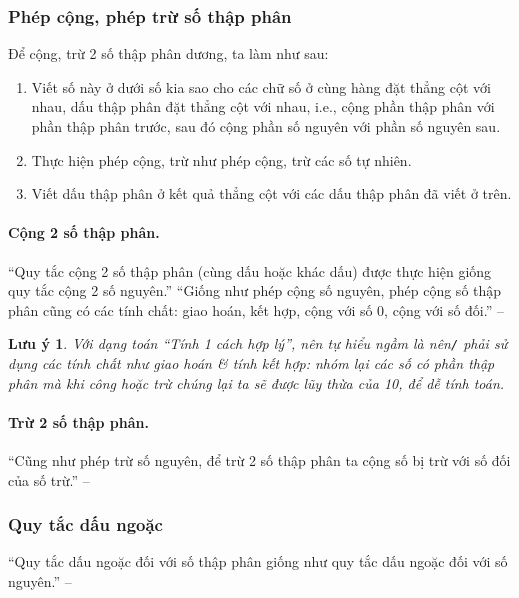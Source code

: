 \documentclass{article}
\numberwithin{equation}{section}
\newtheorem{luuy}{Lưu ý}[section]
\begin{document}
\subsubsection{Phép cộng, phép trừ số thập phân}
Để cộng, trừ 2 số thập phân dương, ta làm như sau:
\begin{enumerate}
	\item Viết số này ở dưới số kia sao cho các chữ số ở cùng hàng đặt thẳng cột với nhau, dấu thập phân đặt thẳng cột với nhau, i.e., cộng phần thập phân với phần thập phân trước, sau đó cộng phần số nguyên với phần số nguyên sau.
	\item Thực hiện phép cộng, trừ như phép cộng, trừ các số tự nhiên.
	\item Viết dấu thập phân ở kết quả thẳng cột với các dấu thập phân đã viết ở trên.
\end{enumerate}

\paragraph{Cộng 2 số thập phân.} ``Quy tắc cộng 2 số thập phân (cùng dấu hoặc khác dấu) được thực hiện giống quy tắc cộng 2 số nguyên.'' ``Giống như phép cộng số nguyên, phép cộng số thập phân cũng có các tính chất: giao hoán, kết hợp, cộng với số 0, cộng với số đối.'' -- \cite[p. 49]{SGK_Toan_6_Canh_Dieu_tap_2}

\begin{luuy}
	Với dạng toán ``Tính 1 cách hợp lý'', nên tự hiểu ngầm là nên\emph{\texttt{/}} phải sử dụng các tính chất như giao hoán \textit{\&} tính kết hợp: nhóm lại các số có phần thập phân mà khi công hoặc trừ chúng lại ta sẽ được lũy thừa của 10, để dễ tính toán.
\end{luuy}

\paragraph{Trừ 2 số thập phân.} ``Cũng như phép trừ số nguyên, để trừ 2 số thập phân ta cộng số bị trừ với số đối của số trừ.'' -- \cite[p. 50]{SGK_Toan_6_Canh_Dieu_tap_2}

\subsubsection{Quy tắc dấu ngoặc}
``Quy tắc dấu ngoặc đối với số thập phân giống như quy tắc dấu ngoặc đối với số nguyên.'' -- \cite[p. 50]{SGK_Toan_6_Canh_Dieu_tap_2}

\end{document}
